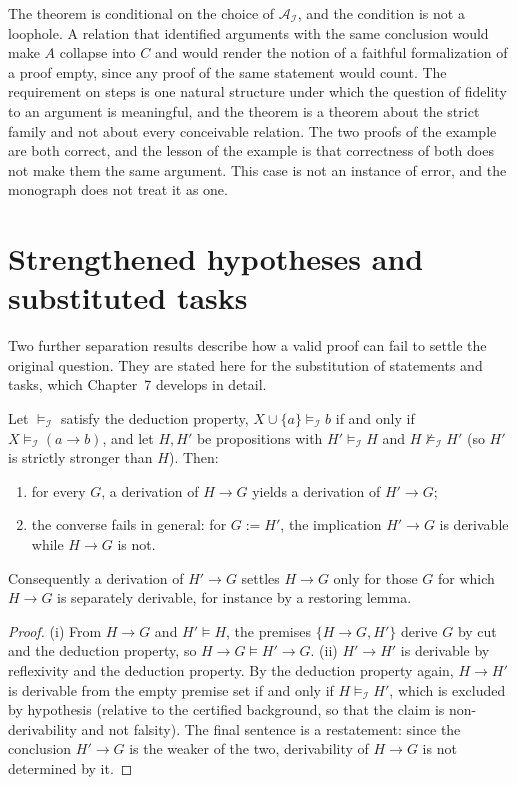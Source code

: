 The theorem is conditional on the choice of $\mathcal{A}_{\mathcal{I}}$, and the condition is not a loophole. A relation that identified arguments with the same conclusion would make $A$ collapse into $C$ and would render the notion of a faithful formalization of a proof empty, since any proof of the same statement would count. The requirement on steps is one natural structure under which the question of fidelity to an argument is meaningful, and the theorem is a theorem about the strict family and not about every conceivable relation. The two proofs of the example are both correct, and the lesson of the example is that correctness of both does not make them the same argument. This case is not an instance of error, and the monograph does not treat it as one.

\section{Strengthened hypotheses and substituted tasks}

Two further separation results describe how a valid proof can fail to settle the original question. They are stated here for the substitution of statements and tasks, which Chapter~7 develops in detail.

\begin{proposition}[RV-004]
\label{prop:rv004}
Let $\models_{\mathcal{I}}$ satisfy the deduction property, $X \cup \{a\} \models_{\mathcal{I}} b$ if and only if $X \models_{\mathcal{I}} (a \to b)$, and let $H, H'$ be propositions with $H' \models_{\mathcal{I}} H$ and $H \not\models_{\mathcal{I}} H'$ (so $H'$ is strictly stronger than $H$). Then:
\begin{enumerate}[label=(\roman*)]
\item for every $G$, a derivation of $H \to G$ yields a derivation of $H' \to G$;
\item the converse fails in general: for $G := H'$, the implication $H' \to G$ is derivable while $H \to G$ is not.
\end{enumerate}
Consequently a derivation of $H' \to G$ settles $H \to G$ only for those $G$ for which $H \to G$ is separately derivable, for instance by a restoring lemma.
\end{proposition}

\begin{proof}
(i) From $H \to G$ and $H' \models H$, the premises $\{H \to G, H'\}$ derive $G$ by cut and the deduction property, so $H \to G \models H' \to G$. (ii) $H' \to H'$ is derivable by reflexivity and the deduction property. By the deduction property again, $H \to H'$ is derivable from the empty premise set if and only if $H \models_{\mathcal{I}} H'$, which is excluded by hypothesis (relative to the certified background, so that the claim is non-derivability and not falsity). The final sentence is a restatement: since the conclusion $H' \to G$ is the weaker of the two, derivability of $H\to G$ is not determined by it.
\end{proof}

